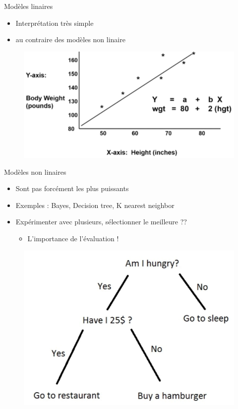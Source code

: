 \documentclass[aspectratio=169,xcolor=dvipsnames, t]{beamer}
\begin{document}
\begin{frame}{Modèles linaires}
	\begin{itemize}
		\item Interprétation très simple
		\item au contraire des modèles non linaire
	\end{itemize}
	\begin{figure}
		\includegraphics[height=0.5\paperheight ]{figures/cm2_LinealModels2.png}
	\end{figure}
\end{frame}



\begin{frame}{Modèles non linaires}
	\begin{itemize}
		\item Sont pas forcément les plus puissants
		\item Exemples : Bayes, Decision tree, K nearest neighbor
		\item Expérimenter avec plusieurs, sélectionner le meilleure ??
		\begin{itemize}
			\item L'importance de l'évaluation !
		\end{itemize}
	\end{itemize}

\begin{figure}
	\includegraphics[height=0.5\paperheight ]{figures/cm2_notLinealModels.png}
\end{figure}
\end{frame}%
\end{document}
